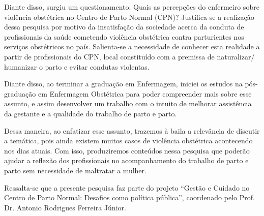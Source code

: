 Diante disso, surgiu um questionamento: Quais as percepções do enfermeiro sobre violência obstétrica no Centro de Parto Normal (CPN)? Justifica-se a realização dessa pesquisa por motivo da insatisfação da sociedade acerca da conduta de profissionais da saúde cometendo violência obstétrica contra parturientes nos serviços obstétricos no país. Salienta-se a necessidade de conhecer esta realidade a partir de profissionais do CPN, local constituído com a premissa de naturalizar/ humanizar o parto e evitar condutas violentas. 

            Diante disso, ao terminar a graduação em Enfermagem, iniciei os estudos na pós-graduação em Enfermagem Obstétrica para poder compreender mais sobre esse assunto, e assim desenvolver um trabalho com o intuito de melhorar assistência da gestante e a qualidade do trabalho de parto e parto.

Dessa maneira, ao enfatizar esse assunto, trazemos à baila a relevância de discutir a temática, pois ainda existem muitos casos de violência obstétrica acontecendo nos dias atuais. Com isso, produziremos conteúdos nessa pesquisa que poderão ajudar a reflexão dos profissionais no acompanhamento do trabalho de parto e parto sem necessidade de maltratar a mulher. 

Ressalta-se que a presente pesquisa faz parte do projeto “Gestão e Cuidado no Centro de Parto Normal: Desafios como política pública”, coordenado pelo Prof. Dr. Antonio Rodrigues Ferreira Júnior.
